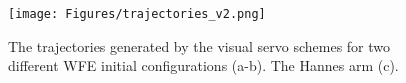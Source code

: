 \begin{comment}
\begin{table}
    \vspace{+0.2cm}
    \centering
    \renewcommand{\arraystretch}{1.2} %
    \setlength{\tabcolsep}{5pt} %
    \caption{\textcolor{blue}{Quantitative results for s-IBVS and pp-IBVS}} 
    \resizebox{\linewidth}{!}{
    \begin{tabular}{c?c|c?c|c} %
        \cline{1-5}
        \multirow{2}{*}{\textbf{Method}} & \multicolumn{2}{c?}{\textbf{Condition 1}} & \multicolumn{2}{c}{\textbf{Condition 2}} \\
        \cline{2-5}
         & Iteration & Error & Iteration & Error  \\ \hline
        s-IBVS           & $\mathbf{129.2 \pm 20.9}$  & $22.5 \pm 19.8$ & $\mathbf{382.0 \pm 57.5}$  & $187.4 \pm 18.5$ \\ 
        pp-IBVS          & $334.5 \pm 55.7$  & $22.5 \pm 19.8$  & $416.0 \pm 65.3$  & $\mathbf{17.6 \pm 9.4}$  \\ \hline
        
    \end{tabular}
    }
    \label{table:vservo_quantitative}
    \vspace{-0.4cm}
\end{table}
\end{comment}




\begin{figure}
    \vspace{+0.3cm}
    \centering
    \texttt{[image: Figures/trajectories\_v2.png]}
    \caption{The trajectories generated by the visual servo schemes for two different WFE initial configurations (a-b). The Hannes arm (c).
    }
    \label{fig:trajectories}
    \vspace{-0.6cm}
\end{figure}


